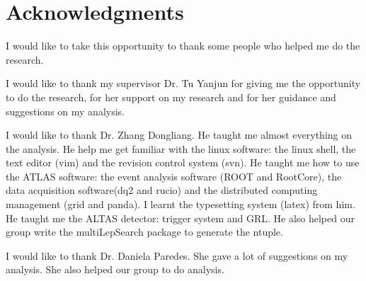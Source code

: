 
\chapter*{Acknowledgments}

I would like to take this opportunity to thank some people who helped me do the research.

I would like to thank my supervisor Dr. Tu Yanjun for giving me the opportunity to do the research, for her support on my research and for her guidance and suggestions on my analysis.

I would like to thank Dr. Zhang Dongliang.
He taught me almost everything on the analysis.
He help me get familiar with the linux software: the linux shell, the text editor (vim) and the revision control system (svn).
He taught me how to use the ATLAS software: the event analysis software (ROOT and RootCore), the data acquisition software(dq2 and rucio) and the distributed computing management (grid and panda).
I learnt the typesetting system (latex) from him.
He taught me the ALTAS detector: trigger system and GRL.
He also helped our group write the multiLepSearch package to generate the ntuple.

I would like to thank Dr. Daniela Paredes.
She gave a lot of suggestions on my analysis.
She also helped our group to do analysis.
